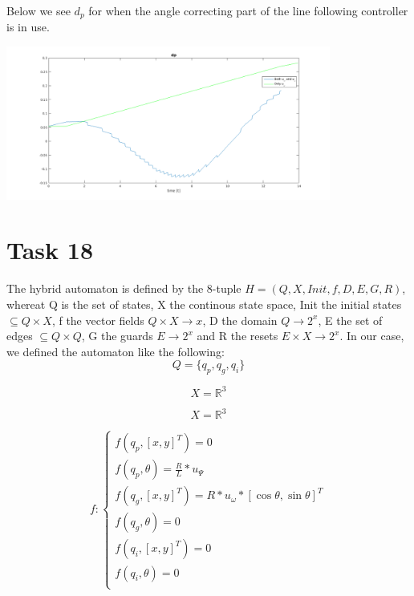 \documentclass[a4paper,12pt,oneside,onecolumn]{article} %
\begin{document}
Below we see $d_p$ for when the angle correcting part of the line following controller is in use.

\begin{center}
  \includegraphics[width = 0.8\textwidth]{task17_dp_both.png}
 \end{center}
\section*{Task 18}

The hybrid automaton is defined by the 8-tuple $H=(Q,X,Init,f,D,E,G,R)$, whereat Q is the set of states, X the continous state space, Init the initial states $\subseteq Q \times X$, f the vector fields $Q \times X \rightarrow x$, D the domain $Q \rightarrow 2^x$, E the set of edges $\subseteq Q \times Q$, G the guards $E \rightarrow 2^x$ and R the resets $E \times X \rightarrow 2^x$. In our case, we defined the automaton like the following:\\

\begin{equation}
Q=\{q_p,q_g,q_i\}	
\end{equation}

\begin{equation}
X=\mathbb{R}^3	
\end{equation} 

\begin{equation}
X=\mathbb{R}^3	
\end{equation}

\begin{equation}
f:
\begin{cases}
f(q_p,[x,y]^T) = 0 \\
f(q_p,\theta) = \frac{R}{L}*u_\Psi \\
f(q_g,[x,y]^T) = R*u_\omega*[\cos{\theta},\sin{\theta}]^T \\
f(q_g,\theta) = 0\\
f(q_i,[x,y]^T) = 0 \\
f(q_i,\theta) = 0\\
\end{cases}
\end{equation}
\end{document}
